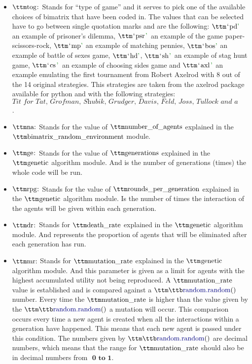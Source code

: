 \begin{itemize}
	\item $\pythoninline{tog:}$ Stands for ``type of game'' and it serves to pick one of the available choices of bimatrix that have been coded in. The values that can be selected have to go between single quotation marks and are the following: $\pythoninline{`pd'}$ an example of prisoner's dilemma, $\pythoninline{`psr'}$ an example of the game paper-scissors-rock, $\pythoninline{`mp'}$ an example of matching pennies, $\pythoninline{`bos'}$ an example of battle of sexes game, $\pythoninline{`hd'}$, $\pythoninline{`sh'}$ an example of stag hunt game, $\pythoninline{`cs'}$ an example of choosing sides game and $\pythoninline{`axl'}$ an example emulating the first tournament from Robert Axelrod with 8 out of the 14 original strategies. This strategies are taken from the axelrod package available for python and with the following strategies: $\textit{Tit for Tat, Grofman, Shubik, Grudger, Davis, Feld, Joss, Tullock and a Random strategy}$.
	\item$\pythoninline{na:}$ Stands for the value of $\pythoninline{number\_of\_agents}$ explained in the $\pythoninline{bimatrix\_random\_environment}$ module.
	\item $\pythoninline{ge:}$ Stands for the value of $\pythoninline{generations}$ explained in the $\pythoninline{genetic}$ algorithm module. And is the number of generations (times) the whole code will be run.
	\item $\pythoninline{rpg:}$ Stands for the value of $\pythoninline{rounds\_per\_generation}$ explained in the $\pythoninline{genetic}$  algorithm module. Is the number of times the interaction of the agents will be given within each generation. 
	\item $\pythoninline{dr:}$ Stands for $\pythoninline{death\_rate}$ explained in the $\pythoninline{genetic}$ algorithm module. And represents the proportion of agents that will be eliminated after each generation has run.
	\item $\pythoninline{mr:}$ Stands for $\pythoninline{mutation\_rate}$ explained in the $\pythoninline{genetic}$ algorithm module. And this parameter is given as a limit for agents with the highest accumulated utility not being reproduced. A $\pythoninline{mutation\_rate}$ value is established and is compared against a $\pythoninline{random.random()}$ number. Every time the $\pythoninline{mutation\_rate}$ is higher than the value given by the $\pythoninline{random.random()}$ a mutation will occur. This comparison occurs every time a new agent is created when all the interactions within a generation have happened. This means that each new agent is passed under this condition. The numbers given by $\pythoninline{random.random()}$ are decimal numbers, which means that the range for $\pythoninline{mutation\_rate}$ should also be in decimal numbers from $\textbf{ 0 to 1}$.

\end{itemize}
